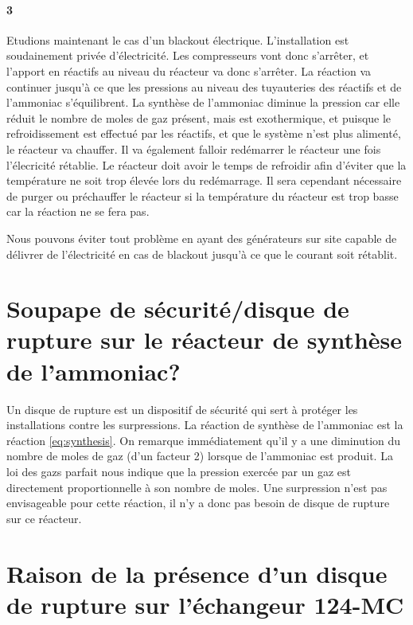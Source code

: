 \paragraph{3} Etudions maintenant le cas d'un blackout électrique. 
L'installation est soudainement privée d'électricité. 
Les compresseurs vont donc s'arrêter, et l'apport en réactifs au niveau 
du réacteur va donc s'arrêter.
La réaction va continuer jusqu'à ce que les pressions au niveau des tuyauteries 
des réactifs et de l'ammoniac s'équilibrent.
La synthèse de l'ammoniac diminue la pression car elle réduit le nombre de moles 
de gaz présent, mais est exothermique, et puisque le refroidissement est effectué 
par les réactifs, et que le système n'est plus alimenté, le réacteur va chauffer.
Il va également falloir redémarrer le réacteur une fois l'élecricité rétablie. 
Le réacteur doit avoir le temps de refroidir afin d'éviter 
que la température ne soit trop élevée lors du redémarrage. 
Il sera cependant nécessaire de purger ou préchauffer le réacteur si
la température du réacteur est trop basse car la réaction ne se fera pas.

Nous pouvons éviter tout problème en ayant des générateurs sur site capable 
de délivrer de l'électricité en cas de blackout jusqu'à ce que 
le courant soit rétablit. 

\section{Soupape de sécurité/disque de rupture sur le réacteur de synthèse de l'ammoniac?}


Un disque de rupture est un dispositif de sécurité qui sert à protéger les installations 
contre les surpressions.
La réaction de synthèse de l'ammoniac est la réaction \ref{eq:synthesis}.
On remarque immédiatement qu'il y a une diminution du nombre de moles de gaz (d'un facteur 2) 
lorsque de l'ammoniac est produit. La loi des gazs parfait nous indique que la pression
exercée par un gaz est directement proportionnelle à son nombre de moles.
Une surpression n'est pas envisageable pour cette réaction, 
il n'y a donc pas besoin de disque de rupture sur ce réacteur.

\section{Raison de la présence d'un disque de rupture sur l'échangeur 124-MC}

